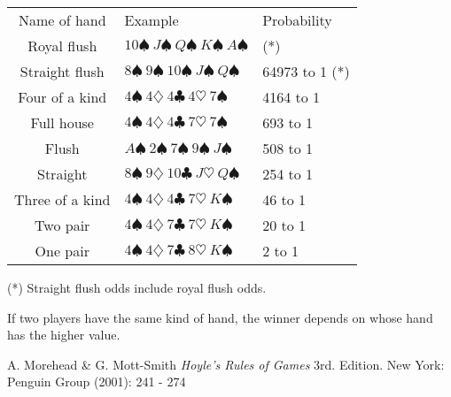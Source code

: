 \documentclass[12pt]{article}
\begin{document}
\begin{tabular}{|c|l|l|}
Name of hand & Example & Probability \\
Royal flush & $10\spadesuit~J\spadesuit~Q\spadesuit~K\spadesuit~A\spadesuit$ & (*) \\
Straight flush & $8\spadesuit~9\spadesuit~10\spadesuit~J\spadesuit~Q\spadesuit$ & 64973 to 1 (*) \\
Four of a kind & $4\spadesuit~4\diamondsuit~4\clubsuit~4\heartsuit~7\spadesuit$ & 4164 to 1 \\
Full house & $4\spadesuit~4\diamondsuit~4\clubsuit~7\heartsuit~7\spadesuit$ & 693 to 1 \\
Flush & $A\spadesuit~2\spadesuit~7\spadesuit~9\spadesuit~J\spadesuit$ & 508 to 1 \\
Straight & $8\spadesuit~9\diamondsuit~10\clubsuit~J\heartsuit~Q\spadesuit$ & 254 to 1 \\
Three of a kind & $4\spadesuit~4\diamondsuit~4\clubsuit~7\heartsuit~K\spadesuit$ & 46 to 1 \\
Two pair & $4\spadesuit~4\diamondsuit~7\clubsuit~7\heartsuit~K\spadesuit$ & 20 to 1 \\
One pair & $4\spadesuit~4\diamondsuit~7\clubsuit~8\heartsuit~K\spadesuit$ & 2 to 1 \\
\end{tabular}

(*) Straight flush odds include royal flush odds.

If two players have the same kind of hand, the winner depends on whose hand has the higher value.

\begin{thebibliography}{1}
 A. Morehead \& G. Mott-Smith {\it Hoyle's Rules of Games} 3rd. Edition. New York: Penguin Group (2001): 241 - 274
\end{thebibliography}
\end{document}
